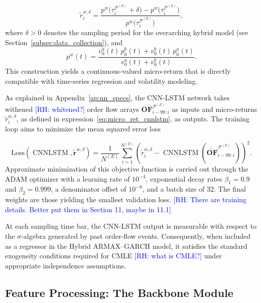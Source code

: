 \documentclass[10pt,a4paper,oneside]{article}
\newcommand{\rh}[1]{\textcolor{blue}{\textsf{[RH: #1]}}}
\DeclareMathOperator{\cnnlstm}{CNNLSTM}
\begin{document}
\begin{equation}
    \tilde{r}^{w, \delta}_{i}
    =
    \frac{p^w\bigl(\tau^{\mathcal{P}^{(E)}}_i + \delta\bigr) - p^w\bigl(\tau^{\mathcal{P}^{(E)}}_i\bigr)}
    {p^w\bigl(\tau^{\mathcal{P}^{(E)}}_i\bigr)},
    \label{eq:micro_ret_cnnlstm}
\end{equation}
where $\delta > 0$ denotes the sampling period for the overarching hybrid model (see Section~\ref{subsec:data_collection}), and
\[
    p^w(t)
    =
    \frac{v^a_0(t)\,p^b_0(t) + v^b_0(t)\,p^a_0(t)}
    {v^a_0(t) + v^b_0(t)}.
\]
This construction yields a continuous-valued micro-return that is directly compatible with time-series regression and volatility modeling.

As explained in Appendix~\ref{ap:nn_specs}, the CNN-LSTM network takes withened \rh{whitened?} order flow arrays $\mathbf{OF}^{\mathcal{P}^{(E)}}_{i - 99:i}$ as inputs and micro-returns $\tilde{r}_i^{w, \delta}$, as defined in expression~\eqref{eq:micro_ret_cnnlstm}, as outputs. The training loop aims to minimize the mean squared error loss

\[
    \text{Loss}(\cnnlstm, \tilde{\mathbf{r}}^{w, \delta})
    =
    \frac{1}{N^{(E)}}
    \sum_{i=1}^{N^{(E)}}
    \left(\tilde{r}_i^{w, \delta} - \cnnlstm\left(\widetilde{\mathbf{OF}}^{\mathcal{P}^{(E)}}_{i - 99:i} \right)\right)^2.
\]
Approximate minimization of this objective function is carried out through the ADAM optimizer \cite{kingma2014adam} with a learning rate of \(10^{-4}\), exponential decay rates \(\beta_1 = 0.9\) and \(\beta_2 = 0.999\), a denominator offset of \(10^{-8}\), and a batch size of \(32\). The final weights are those yielding the smallest validation loss. \rh{There are training details. Better put them in Section 11, maybe in 11.1}

At each sampling time bar, the CNN-LSTM output is measurable with respect to the $\sigma$-algebra generated by past order-flow events. Consequently, when included as a regressor in the Hybrid ARMAX–GARCH model, it satisfies the standard exogeneity conditions required for CMLE \rh{what is CMLE?} under appropriate independence assumptions.

\subsection{Feature Processing: The Backbone Module}
\label{subsec:feature_extraction}
\end{document}
